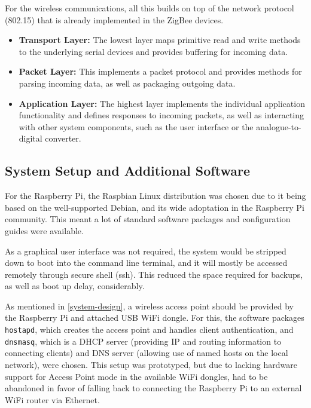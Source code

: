 For the wireless communications, all this builds on top of the network protocol (802.15) that is already implemented in the ZigBee devices.

\begin{itemize}
	\item \textbf{Transport Layer:} The lowest layer maps primitive read and write methods to the underlying serial devices and provides buffering for incoming data.
	\item \textbf{Packet Layer:} This implements a packet protocol and provides methods for parsing incoming data, as well as packaging outgoing data.
	\item \textbf{Application Layer:} The highest layer implements the individual application functionality and defines responses to incoming packets, as well as interacting with other system components, such as the user interface or the analogue-to-digital converter.
\end{itemize}

\subsection{System Setup and Additional Software}
For the Raspberry Pi, the Raspbian Linux distribution was chosen due to it being based on the well-supported Debian, and its wide adoptation in the Raspberry Pi community. This meant a lot of standard software packages and configuration guides were available.

As a graphical user interface was not required, the system would be stripped down to boot into the command line terminal, and it will mostly be accessed remotely through secure shell (ssh). This reduced the space required for backups, as well as boot up delay, considerably.

As mentioned in \ref{system-design}, a wireless access point should be provided by the Raspberry Pi and attached USB WiFi dongle. For this, the software packages \texttt{hostapd}\cite{hostapd}, which creates the access point and handles client authentication, and \texttt{dnsmasq}\cite{dnsmasq}, which is a DHCP server (providing IP and routing information to connecting clients) and DNS server (allowing use of named hosts on the local network), were chosen. This setup was prototyped, but due to lacking hardware support for Access Point mode in the available WiFi dongles, had to be abandoned in favor of falling back to connecting the Raspberry Pi to an external WiFi router via Ethernet.
